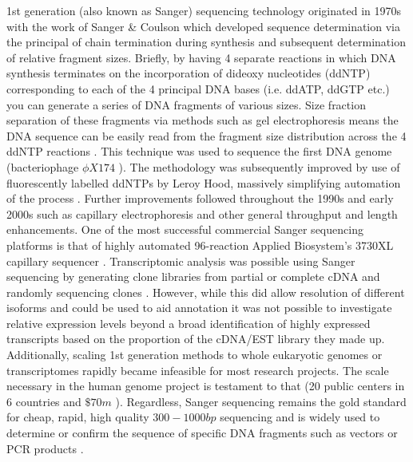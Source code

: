 1st generation (also known as Sanger) sequencing technology originated in 1970s with the work of Sanger \&
Coulson \citep{Sanger1975,Sanger1977,Sanger1977a} which 
developed sequence determination via the principal of chain termination during 
synthesis and subsequent determination of relative fragment sizes. 
Briefly, by having 4 separate reactions in which DNA synthesis terminates on the incorporation
of dideoxy nucleotides (ddNTP) corresponding to each of the 4 principal DNA bases (i.e. ddATP, ddGTP etc.) 
you can generate a series of DNA fragments of various sizes.  Size fraction separation of these fragments 
via methods such as gel electrophoresis means the DNA sequence can be easily read from the fragment size distribution
across the 4 ddNTP reactions \citep{Sanger1977a}. 
This technique was used to sequence the first DNA genome (bacteriophage \(\phi X174\) \citep{Sanger1977}).
The methodology was subsequently improved by use of fluorescently labelled ddNTPs by Leroy Hood,
massively simplifying automation of the process \citep{Smith1985,Smith1986}.
Further improvements followed throughout the 1990s and early 2000s such as capillary electrophoresis
and other general throughput and length enhancements.  One of the most successful commercial 
Sanger sequencing platforms is that of highly automated 96-reaction Applied Biosystem's 3730XL capillary sequencer \citep{Bonetta2006}.
Transcriptomic analysis was possible using Sanger sequencing by generating clone libraries from partial or complete cDNA and randomly sequencing
clones \citep{Adams1991,Gerhard2004}.  However, while this did allow resolution of different isoforms and could be used to aid annotation \citep{Adams1991}
it was not possible to investigate relative expression levels beyond a broad identification of highly expressed transcripts based on the 
proportion of the cDNA/EST library they made up.
Additionally, scaling 1st generation methods to whole eukaryotic genomes or transcriptomes 
rapidly became infeasible for most research projects. The scale necessary in the human genome project \citep{Lander2001,Venter2001} is testament to that 
(20 public centers in 6 countries \citep{Collins2003} and \(\$70m\) \citep{Pettersson2009}).  
Regardless, Sanger sequencing remains the gold standard for cheap, rapid, high quality \(300-1000bp\) sequencing and 
is widely used to determine or confirm the sequence of specific DNA fragments such as vectors or PCR products \citep{Bonetta2006,Tsiatis2010}.  


